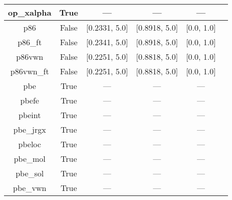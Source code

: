 \begin{tabular}{|c|c|c|c|c|l|}
    op\_xalpha &                  True &              --- &              --- &            --- &                      \cite{Tsuneda1999_10664,Tsuneda1999_5656} \\ \hline
           p86 &                 False &    [0.2331, 5.0] &    [0.8918, 5.0] &     [0.0, 1.0] &                                         \cite{Perdew1986_8822} \\ \hline
       p86\_ft &                 False &    [0.2341, 5.0] &    [0.8918, 5.0] &     [0.0, 1.0] &                                         \cite{Perdew1986_8822} \\ \hline
        p86vwn &                 False &    [0.2251, 5.0] &    [0.8818, 5.0] &     [0.0, 1.0] &                                         \cite{Perdew1986_8822} \\ \hline
    p86vwn\_ft &                 False &    [0.2251, 5.0] &    [0.8818, 5.0] &     [0.0, 1.0] &                                         \cite{Perdew1986_8822} \\ \hline
           pbe &                  True &              --- &              --- &            --- &                     \cite{Perdew1996_3865,Perdew1996_3865_err} \\ \hline
         pbefe &                  True &              --- &              --- &            --- &                                          \cite{Perez2015_3844} \\ \hline
        pbeint &                  True &              --- &              --- &            --- &                                      \cite{Fabiano2010_113104} \\ \hline
     pbe\_jrgx &                  True &              --- &              --- &            --- &                                      \cite{Pedroza2009_201106} \\ \hline
        pbeloc &                  True &              --- &              --- &            --- &                                   \cite{Constantin2012_035130} \\ \hline
      pbe\_mol &                  True &              --- &              --- &            --- &                                     \cite{delCampo2012_104108} \\ \hline
      pbe\_sol &                  True &              --- &              --- &            --- &                                       \cite{Perdew2008_136406} \\ \hline
      pbe\_vwn &                  True &              --- &              --- &            --- & \cite{Kraisler2010_042516,Perdew1996_3865,Perdew1996_3865_err} \\ \hline

\end{tabular}
